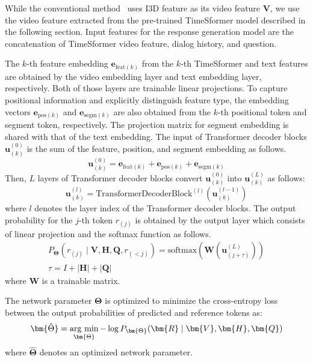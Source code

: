 \documentclass[letterpaper]{article} %
\newcommand{\argmin}{\mathop{\rm arg~min}\limits}
\begin{document}
While the conventional method~\cite{Li2021bridging} uses I3D feature as its video feature $\bm{V}$, we use the video feature extracted from the pre-trained TimeSformer model described in the following section.
Input features for the response generation model are the concatenation of TimeSformer video feature, dialog history, and question.

The $k$-th feature embedding $\bm{e}_{\textrm{feat}(k)}$ from the $k$-th TimeSformer and text features are obtained by the video embedding layer and text embedding layer, respectively.
Both of those layers are trainable linear projections.
To capture positional information and explicitly distinguish feature type, the embedding vectors $\bm{e}_{\textrm{pos}(k)}$ and $\bm{e}_{\textrm{segm}(k)}$ are also obtained from the $k$-th positional token and segment token, respectively.
The projection matrix for segment embedding is shared with that of the text embedding.
The input of Transformer decoder blocks $\bm{u}_{(k)}^{(0)}$ is the sum of the feature, position, and segment embedding as follows.
\begin{equation}
  \bm{u}_{(k)}^{(0)} = \bm{e}_{\textrm{feat}(k)} + \bm{e}_{\textrm{pos}(k)} + \bm{e}_{\textrm{segm}(k)}
\end{equation}
Then, $L$ layers of Transformer decoder blocks convert $\bm{u}_{(k)}^{(0)}$ into $\bm{u}_{(k)}^{(L)}$ as follows:
\begin{equation}
  \bm{u}_{(k)}^{(l)} = \textrm{TransformerDecoderBlock}^{(l)}(\bm{u}_{(k)}^{(l-1)})
\end{equation}
where $l$ denotes the layer index of the Transformer decoder blocks.
The output probability for the $j$-th token $r_{(j)}$ is obtained by the output layer which consists of linear projection and the softmax function as follows.
\begin{gather}
  P_{\bm{\Theta}}(r_{(j)} \mid \bm{V}, \bm{H}, \bm{Q}, r_{(<j)}) = \textrm{softmax}(\bm{W}(\bm{u}_{(j+\tau)}^{(L)})) \\
  \tau = I + |\bm{H}| + |\bm{Q}|
\end{gather}
where $\bm{W}$ is a trainable matrix.

% 
The network parameter $\bm{\Theta}$ is optimized to minimize the cross-entropy loss between the output probabilities of predicted and reference tokens as:
\begin{equation}
  \bm{\hat{\Theta}} = \argmin_{\bm{\Theta}}-\log P_{\bm{\Theta}}(\bm{R} \mid \bm{V}, \bm{H}, \bm{Q})
\end{equation}
where $\bm{\hat{\Theta}}$ denotes an optimized network parameter.
\end{document}
